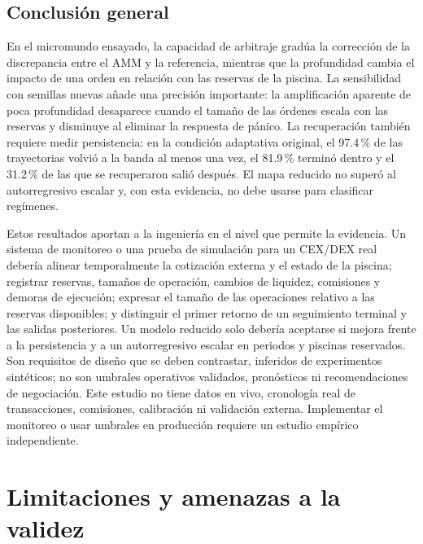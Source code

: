 \begin{samepage}
\section{Conclusión general}

En el micromundo ensayado, la capacidad de arbitraje gradúa la corrección de la discrepancia entre el AMM y la referencia, mientras que la profundidad cambia el impacto de una orden en relación con las reservas de la piscina. La sensibilidad con semillas nuevas añade una precisión importante: la amplificación aparente de poca profundidad desaparece cuando el tamaño de las órdenes escala con las reservas y disminuye al eliminar la respuesta de pánico. La recuperación también requiere medir persistencia: en la condición adaptativa original, el 97.4\,\% de las trayectorias volvió a la banda al menos una vez, el 81.9\,\% terminó dentro y el 31.2\,\% de las que se recuperaron salió después. El mapa reducido no superó al autorregresivo escalar y, con esta evidencia, no debe usarse para clasificar regímenes.

Estos resultados aportan a la ingeniería en el nivel que permite la evidencia. Un sistema de monitoreo o una prueba de simulación para un CEX/DEX real debería alinear temporalmente la cotización externa y el estado de la piscina; registrar reservas, tamaños de operación, cambios de liquidez, comisiones y demoras de ejecución; expresar el tamaño de las operaciones relativo a las reservas disponibles; y distinguir el primer retorno de un seguimiento terminal y las salidas posteriores. Un modelo reducido solo debería aceptarse si mejora frente a la persistencia y a un autorregresivo escalar en periodos y piscinas reservados. Son requisitos de diseño que se deben contrastar, inferidos de experimentos sintéticos; no son umbrales operativos validados, pronósticos ni recomendaciones de negociación. Este estudio no tiene datos en vivo, cronología real de transacciones, comisiones, calibración ni validación externa. Implementar el monitoreo o usar umbrales en producción requiere un estudio empírico independiente.

\end{samepage}

\section{Limitaciones y amenazas a la validez}

